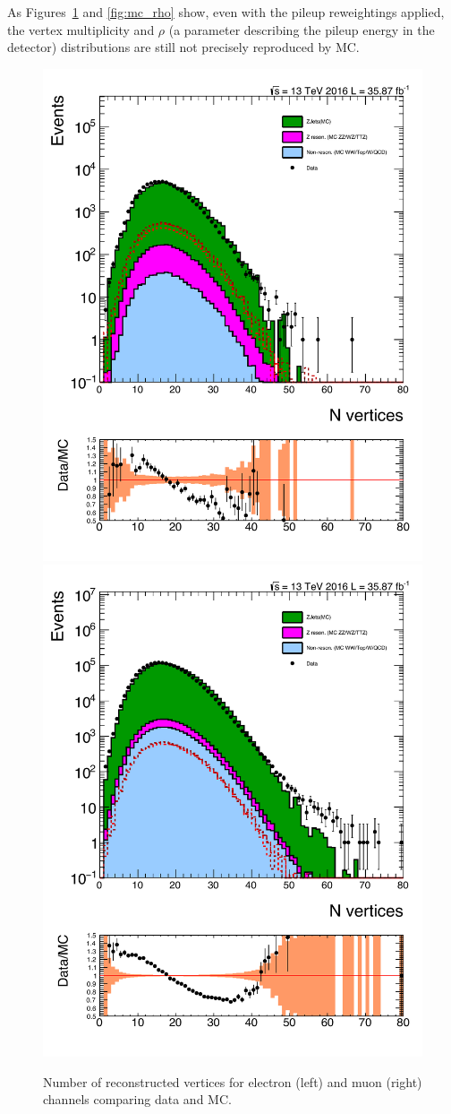 As Figures~\ref{fig:mc_nvtx} and \ref{fig:mc_rho} show, even with the pileup reweightings applied, the vertex multiplicity and $\rho$ (a parameter describing the pileup energy in the detector) distributions are still not precisely reproduced by MC.
\begin{figure}[htbp!]
\centering
\includegraphics[width=0.46\linewidth, page=1]{figures/ReMiniSummer16_MC_GMCPhPtWt_tightzpt50_puWeightsummer16_metfilter_unblind_el_log_1pb.pdf}
\includegraphics[width=0.46\linewidth, page=1]{figures/ReMiniSummer16_MC_GMCPhPtWt_tightzpt50_puWeightsummer16_metfilter_unblind_mu_log_1pb.pdf}
\caption{Number of reconstructed vertices for electron (left) and muon (right) channels comparing data and MC.}
\label{fig:mc_nvtx}
\end{figure}

